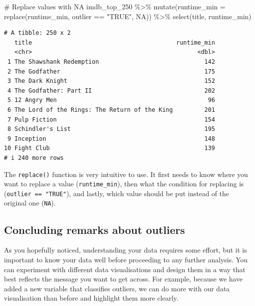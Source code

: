 \documentclass[
  letterpaper,
]{krantz}
\makeatletter
\newenvironment{Shaded}{\begin{snugshade}}{\end{snugshade}}
\newcommand{\AttributeTok}[1]{\textcolor[rgb]{0.40,0.45,0.13}{#1}}
\newcommand{\CommentTok}[1]{\textcolor[rgb]{0.37,0.37,0.37}{#1}}
\newcommand{\ConstantTok}[1]{\textcolor[rgb]{0.56,0.35,0.01}{#1}}
\newcommand{\FunctionTok}[1]{\textcolor[rgb]{0.28,0.35,0.67}{#1}}
\newcommand{\NormalTok}[1]{\textcolor[rgb]{0.00,0.23,0.31}{#1}}
\newcommand{\SpecialCharTok}[1]{\textcolor[rgb]{0.37,0.37,0.37}{#1}}
\newcommand{\StringTok}[1]{\textcolor[rgb]{0.13,0.47,0.30}{#1}}
\newenvironment{kframe}{%
\medskip{}
\setlength{\fboxsep}{.8em}
 \def\at@end@of@kframe{}%
 \ifinner\ifhmode%
  \def\at@end@of@kframe{\end{minipage}}%
  \begin{minipage}{\columnwidth}%
 \fi\fi%
 \def\FrameCommand##1{\hskip\@totalleftmargin \hskip-\fboxsep
 \colorbox{shadecolor}{##1}\hskip-\fboxsep
     \hskip-\linewidth \hskip-\@totalleftmargin \hskip\columnwidth}%
 \MakeFramed {\advance\hsize-\width
   \@totalleftmargin\z@ \linewidth\hsize
   \@setminipage}}%
 {\par\unskip\endMakeFramed%
 \at@end@of@kframe}
\renewenvironment{Shaded}{\begin{kframe}}{\end{kframe}}
\makeatother
\begin{document}
\begin{Shaded}
\begin{Highlighting}[]
\CommentTok{\# Replace values with NA}
\NormalTok{imdb\_top\_250 }\SpecialCharTok{\%\textgreater{}\%}
  \FunctionTok{mutate}\NormalTok{(}\AttributeTok{runtime\_min =} \FunctionTok{replace}\NormalTok{(runtime\_min, outlier }\SpecialCharTok{==} \StringTok{"TRUE"}\NormalTok{, }\ConstantTok{NA}\NormalTok{)) }\SpecialCharTok{\%\textgreater{}\%}
  \FunctionTok{select}\NormalTok{(title, runtime\_min)}
\end{Highlighting}
\end{Shaded}

\begin{verbatim}
# A tibble: 250 x 2
   title                                         runtime_min
   <chr>                                               <dbl>
 1 The Shawshank Redemption                              142
 2 The Godfather                                         175
 3 The Dark Knight                                       152
 4 The Godfather: Part II                                202
 5 12 Angry Men                                           96
 6 The Lord of the Rings: The Return of the King         201
 7 Pulp Fiction                                          154
 8 Schindler's List                                      195
 9 Inception                                             148
10 Fight Club                                            139
# i 240 more rows
\end{verbatim}

The \texttt{replace()} function is very intuitive to use. It first needs
to know where you want to replace a value (\texttt{runtime\_min}), then
what the condition for replacing is (\texttt{outlier\ ==\ "TRUE"}), and
lastly, which value should be put instead of the original one
(\texttt{NA}).

\subsection{Concluding remarks about
outliers}\label{concluding-remarks-outliers}

As you hopefully noticed, understanding your data requires some effort,
but it is important to know your data well before proceeding to any
further analysis. You can experiment with different data visualisations
and design them in a way that best reflects the message you want to get
across. For example, because we have added a new variable that
classifies outliers, we can do more with our data visualisation than
before and highlight them more clearly.
\end{document}

